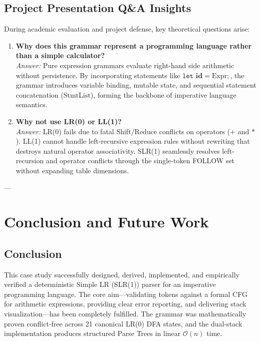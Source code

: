 \documentclass[11pt,a4paper]{article}
\begin{document}
\subsection{Project Presentation Q\&A Insights}
During academic evaluation and project defense, key theoretical questions arise:
\begin{enumerate}
    \item \textbf{Why does this grammar represent a programming language rather than a simple calculator?} \\
    \textit{Answer:} Pure expression grammars evaluate right-hand side arithmetic without persistence. By incorporating statements like $\texttt{let } \mathbf{id} = \text{Expr} ;$, the grammar introduces variable binding, mutable state, and sequential statement concatenation ($\text{StmtList}$), forming the backbone of imperative language semantics.
    \item \textbf{Why not use LR(0) or LL(1)?} \\
    \textit{Answer:} LR(0) fails due to fatal Shift/Reduce conflicts on operators ($+$ and $*$). LL(1) cannot handle left-recursive expression rules without rewriting that destroys natural operator associativity. SLR(1) seamlessly resolves left-recursion and operator conflicts through the single-token FOLLOW set without expanding table dimensions.
\end{enumerate}

---

\section{Conclusion and Future Work}

\subsection{Conclusion}
This case study successfully designed, derived, implemented, and empirically verified a deterministic Simple LR (SLR(1)) parser for an imperative programming language. The core aim---validating tokens against a formal CFG for arithmetic expressions, providing clear error reporting, and delivering stack visualization---has been completely fulfilled. The grammar was mathematically proven conflict-free across 21 canonical LR(0) DFA states, and the dual-stack implementation produces structured Parse Trees in linear $\mathcal{O}(n)$ time.
\end{document}
